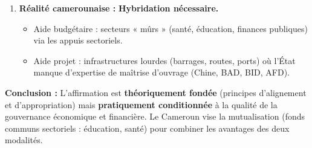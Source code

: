 \documentclass[11pt]{article}
\newcommand{\cle}[1]{{\popxbold\color{popdark}#1}}
\begin{document}
\begin{exoresolu}
\begin{enumerate}
\begin{itemize}
                \item \textbf{Conditionnalités lourdes :} Les « \cle{actions préalables} » au décaissement sont parfois perçues comme une ingérence (ex. réforme des prix des carburants, réforme des retraites).
                \item \textbf{Capacité d'absorption :} Trésorerie tendue $\rightarrow$ retards de paiement des fournisseurs (arriérés intérieurs) malgré l'aide budgétaire.
                \item \textbf{Suspensions possibles :} Gel des décaissements en cas d'écarts par rapport au programme (instabilité du financement).
            \end{itemize}
        \item \textbf{Réalité camerounaise :} \textbf{Hybridation nécessaire.}
            \begin{itemize}
                \item Aide budgétaire : secteurs « mûrs » (santé, éducation, finances publiques) via les appuis sectoriels.
                \item Aide projet : infrastructures lourdes (barrages, routes, ports) où l'État manque d'expertise de maîtrise d'ouvrage (Chine, BAD, BID, AFD).
            \end{itemize}
    \end{enumerate}
    \textbf{Conclusion :} L'affirmation est \textbf{théoriquement fondée} (principes d'alignement et d'appropriation) mais \textbf{pratiquement conditionnée} à la qualité de la \cle{gouvernance économique et financière}. Le Cameroun vise la \cle{mutualisation} (fonds communs sectoriels : éducation, santé) pour combiner les avantages des deux modalités.
\end{exoresolu}
\end{document}
